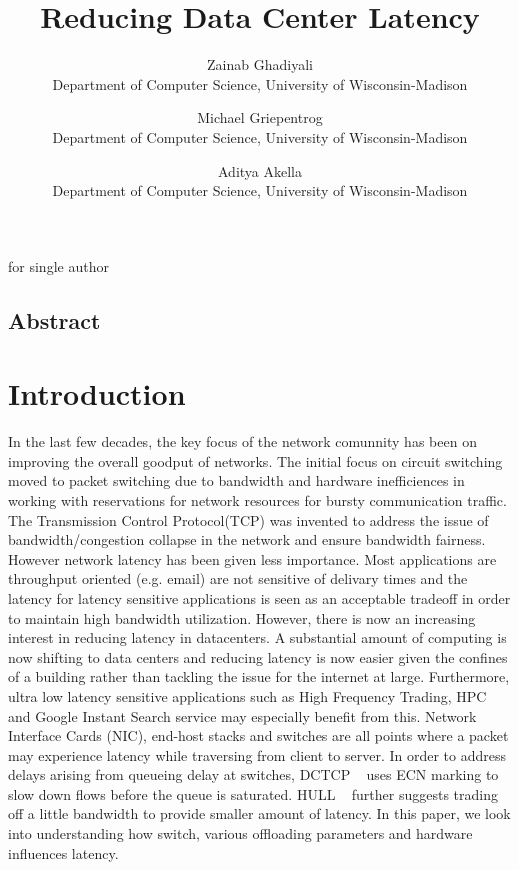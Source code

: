\date{} \usepackage{usenix} \title{\Large \bf Reducing Data Center Latency}

for single author \author{ 
{\rm Zainab Ghadiyali}\\ Department of Computer
Science, University of Wisconsin-Madison 
\and {\rm Michael Griepentrog}\\
Department of Computer Science, University of Wisconsin-Madison 
\and{\rm Aditya Akella}\\
Department of Computer Science, University of Wisconsin-Madison
} 


\maketitle

\thispagestyle{empty}


\subsection*{Abstract}

\section{Introduction} In the last few decades, the key focus of the network
comunnity has been on improving the overall goodput of networks. The initial
focus on circuit switching moved to packet switching due to bandwidth and
hardware inefficiences in working with reservations for network resources for
bursty communication traffic. The Transmission Control Protocol(TCP) was
invented to address the issue of bandwidth/congestion collapse in the network
and ensure bandwidth fairness.~\cite{DCTCP,Queueing,TCP_Pacing} However network
latency has been given less importance. Most applications are throughput
oriented (e.g. email) are not sensitive of delivary times and the latency for
latency sensitive applications is seen as an acceptable tradeoff in order to
maintain high bandwidth utilization.   
However, there is now an increasing interest in reducing latency in
datacenters. A substantial amount of computing is now shifting to data centers
and reducing latency is now easier given the confines of a building rather than
tackling the issue for the internet at large. Furthermore, ultra low latency
 sensitive applications such as High Frequency Trading, HPC and Google Instant 
Search service may especially benefit from this. 
Network Interface Cards (NIC), end-host stacks and switches are all points 
where a packet may experience latency while traversing from client to server. 
In order to address delays arising from queueing delay at switches, 
DCTCP ~\cite{DCTCP} uses ECN marking to slow down flows before the queue is 
saturated. HULL ~\cite{HULL} further suggests trading off a little bandwidth to 
provide smaller amount of latency.  
In this paper, we look into understanding how switch, various offloading
parameters and hardware influences latency.

